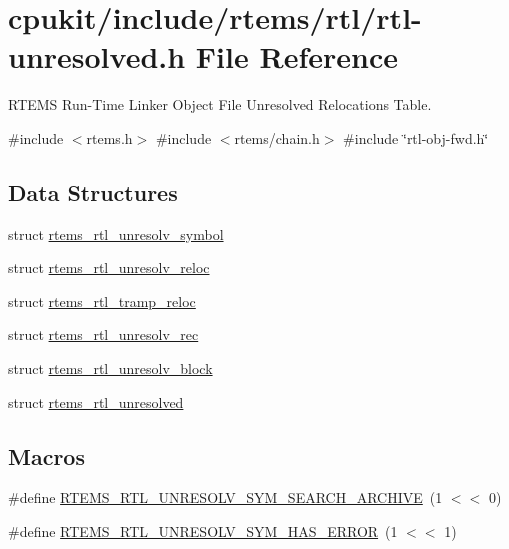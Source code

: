 \hypertarget{rtl-unresolved_8h}{}\section{cpukit/include/rtems/rtl/rtl-\/unresolved.h File Reference}
\label{rtl-unresolved_8h}


R\+T\+E\+MS Run-\/\+Time Linker Object File Unresolved Relocations Table.  


{\ttfamily \#include $<$rtems.\+h$>$}\newline
{\ttfamily \#include $<$rtems/chain.\+h$>$}\newline
{\ttfamily \#include \char`\"{}rtl-\/obj-\/fwd.\+h\char`\"{}}\newline
\subsection*{Data Structures}
\begin{DoxyCompactItemize}
\item 
struct \mbox{\hyperlink{structrtems__rtl__unresolv__symbol}{rtems\+\_\+rtl\+\_\+unresolv\+\_\+symbol}}
\item 
struct \mbox{\hyperlink{structrtems__rtl__unresolv__reloc}{rtems\+\_\+rtl\+\_\+unresolv\+\_\+reloc}}
\item 
struct \mbox{\hyperlink{structrtems__rtl__tramp__reloc}{rtems\+\_\+rtl\+\_\+tramp\+\_\+reloc}}
\item 
struct \mbox{\hyperlink{structrtems__rtl__unresolv__rec}{rtems\+\_\+rtl\+\_\+unresolv\+\_\+rec}}
\item 
struct \mbox{\hyperlink{structrtems__rtl__unresolv__block}{rtems\+\_\+rtl\+\_\+unresolv\+\_\+block}}
\item 
struct \mbox{\hyperlink{structrtems__rtl__unresolved}{rtems\+\_\+rtl\+\_\+unresolved}}
\end{DoxyCompactItemize}
\subsection*{Macros}
\begin{DoxyCompactItemize}
\item 
\#define \mbox{\hyperlink{rtl-unresolved_8h_a68b50b8e30c5f63e3364a72c49e4ff80}{R\+T\+E\+M\+S\+\_\+\+R\+T\+L\+\_\+\+U\+N\+R\+E\+S\+O\+L\+V\+\_\+\+S\+Y\+M\+\_\+\+S\+E\+A\+R\+C\+H\+\_\+\+A\+R\+C\+H\+I\+VE}}~(1 $<$$<$ 0)
\item 
\#define \mbox{\hyperlink{rtl-unresolved_8h_ac67a67fc4f26c05ecc799ba21fe04ed4}{R\+T\+E\+M\+S\+\_\+\+R\+T\+L\+\_\+\+U\+N\+R\+E\+S\+O\+L\+V\+\_\+\+S\+Y\+M\+\_\+\+H\+A\+S\+\_\+\+E\+R\+R\+OR}}~(1 $<$$<$ 1)
\end{DoxyCompactItemize}
